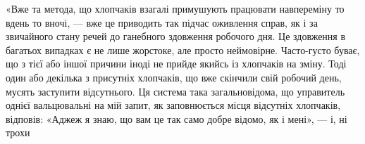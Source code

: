 «Вже та метода, що хлопчаків взагалі примушують працювати
навпереміну то вдень то вночі, — вже це приводить так підчас
оживлення справ, як і за звичайного стану речей до ганебного здовження
робочого дня. Це здовження в багатьох випадках є не лише
жорстоке, але просто неймовірне. Часто-густо буває, що з тієї
або іншої причини іноді не прийде якийсь із хлопчаків на зміну.
Тоді один або декілька з присутніх хлопчаків, що вже скінчили
свій робочий день, мусять заступити відсутнього. Ця система
така загальновідома, що управитель однієї вальцювальні на мій запит,
як заповнюється місця відсутніх хлопчаків, відповів: «Аджеж
я знаю, що вам це так само добре відомо, як і мені», — і, ні трохи
\parbreak{}  %
